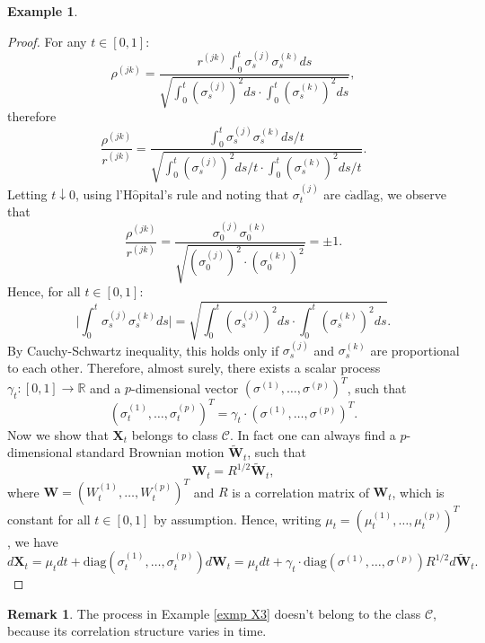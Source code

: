 \documentclass[a4paper,11pt]{article}
\theoremstyle{plain}
\theoremstyle{definition}
\newtheorem{exmp}[thm]{Example}
\newtheorem{rmrk}[thm]{Remark}
\newcommand{\MR}{\mathbb{R}}
\newcommand{\diag}{\mathrm{diag}}
\begin{document}
\begin{exmp}
    		\begin{proof}
    			For any $t \in [0, 1]$: 
    			\[ \rho^{(jk)} = \frac{r^{(jk)} \int_{0}^{t} \sigma_s^{(j)}\sigma_s^{(k)} ds }{\sqrt{\int_{0}^{t} (\sigma_s^{(j)})^2 ds \cdot \int_{0}^{t} (\sigma_s^{(k)})^2 ds}}, \]
    			therefore
    			\[ \frac{\rho^{(jk)}}{r^{(jk)}} = \frac{\int_{0}^{t} \sigma_s^{(j)}\sigma_s^{(k)} ds/t }{\sqrt{\int_{0}^{t} (\sigma_s^{(j)})^2 ds/t \cdot \int_{0}^{t} (\sigma_s^{(k)})^2 ds/t}}. \]
    			Letting $t \downarrow 0$, using l'H$\hat{\text{o}}$pital's rule and noting that $\sigma_t^{(j)}$ are c$\grave{\text{a}}$dl$\grave{\text{a}}$g, we observe that
    			\[ \frac{\rho^{(jk)}}{r^{(jk)}} = \frac{\sigma_0^{(j)}\sigma_0^{(k)}}{ \sqrt{  (\sigma_0^{(j)})^2 \cdot (\sigma_0^{(k)})^2 }} = \pm 1. \]
    			Hence, for all $t \in [0, 1]$:
    			\[ \bigg| \int_{0}^{t}\sigma_s^{(j)}\sigma_s^{(k)} ds \bigg| = \sqrt{\int_{0}^{t} (\sigma_s^{(j)})^2 ds \cdot \int_{0}^{t} (\sigma_s^{(k)})^2 ds} . \]
    			By Cauchy-Schwartz inequality, this holds only if $\sigma_s^{(j)}$ and $\sigma_s^{(k)}$ are proportional to each other. Therefore, almost surely, there exists a scalar process $\gamma_t : [0, 1] \rightarrow \MR$ and a $p$-dimensional vector $(\sigma^{(1)}, \dots, \sigma^{(p)})^T$, such that
    			\[ (\sigma_t^{(1)}, \dots, \sigma_t^{(p)})^T = \gamma_t \cdot (\sigma^{(1)}, \dots, \sigma^{(p)})^T. \]
    			Now we show that $\mathbf{X}_t$ belongs to class $\mathcal{C}$. In fact one can always find a $p$-dimensional standard Brownian motion $\widetilde{\mathbf{W}}_t$, such that 
    			\[ \mathbf{W}_t = R^{1/2}\widetilde{\mathbf{W}}_t, \]
    			where $\mathbf{W} = (W_t^{(1)}, \dots, W_t^{(p)})^T$ and $R$ is a correlation matrix of $\mathbf{W}_t$, which is constant for all $t \in [0, 1]$ by assumption. Hence, writing $\mu_t = (\mu_t^{(1)}, \dots, \mu_t^{(p)})^T$, we have
    			\[ d\mathbf{X}_t = \mu_t dt + \diag(\sigma_t^{(1)}, \dots, \sigma_t^{(p)}) d\mathbf{W}_t = \mu_t dt +\gamma_t \cdot \diag(\sigma^{(1)}, \dots, \sigma^{(p)}) R^{1/2} d\widetilde{\mathbf{W}}_t. \]
    		\end{proof}
    \end{exmp}
    
    \begin{rmrk}
    	The process in Example \ref{exmp X3} doesn't belong to the class $\mathcal{C}$, because its correlation structure varies in time.
    \end{rmrk}
    		
\end{document}
